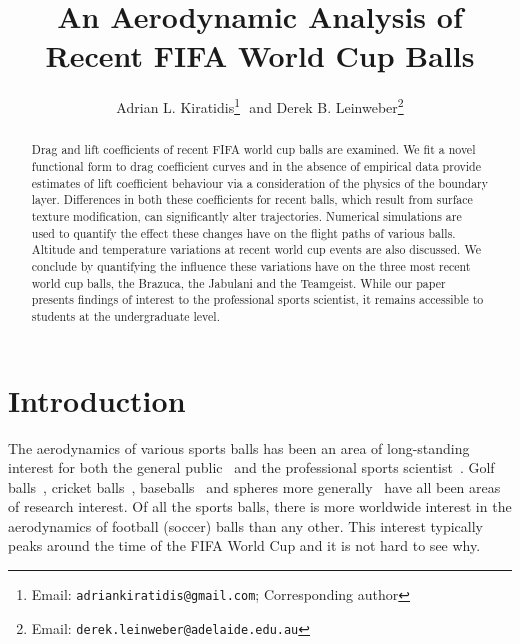 \documentclass[a4paper]{article}
\begin{document}
\title{An Aerodynamic Analysis of Recent FIFA World Cup Balls}

\author{Adrian L. Kiratidis\thanks{Email: \texttt{adriankiratidis@gmail.com}; Corresponding author}\,\, and Derek B. Leinweber\thanks{Email: \texttt{derek.leinweber@adelaide.edu.au}}}
%
\maketitle
%
\begin{abstract}
Drag and lift coefficients of recent FIFA world cup balls are examined.  We fit a novel functional form to drag coefficient curves and in the absence of empirical data provide estimates of lift coefficient behaviour via a consideration of the physics of the boundary layer.  Differences in both these coefficients for recent balls, which result from surface texture modification, can significantly alter trajectories.  Numerical simulations are used to quantify the effect these changes have on the flight paths of various balls.  Altitude  and temperature variations at recent world cup events are also discussed.  We conclude by quantifying the influence these variations have on the three most recent world cup balls, the Brazuca, the Jabulani and the Teamgeist.  While our paper presents findings of interest to the professional sports scientist, it remains accessible to students at the undergraduate level.
\end{abstract}


\section{Introduction}
The aerodynamics of various sports balls has been an area of long-standing interest for both the general public~\cite{TubulentTimes, SurpriseAttack, Swingersdelight, BehindtheSeams, CricketInFullSwing} and the professional sports scientist~\cite{MehtaRD, MehtaRDandPallisJM, HaakeSJGoodwillSRandCarreMJ}.  Golf balls~\cite{Alam-Golf, Nauro-Golf}, cricket balls~\cite{Mehta-Cricketball, Sayers-Cricketball}, baseballs~\cite{BaseballPaper, BaseballRef} and spheres more generally~\cite{AchenbachEhighRe, AchenbachEroughsurf} have all been areas of research interest.  
Of all the sports balls, there is more worldwide interest in the aerodynamics of football (soccer) balls than any other.  This interest typically peaks around the time of the FIFA World Cup and it is not hard to see why.
\end{document}
